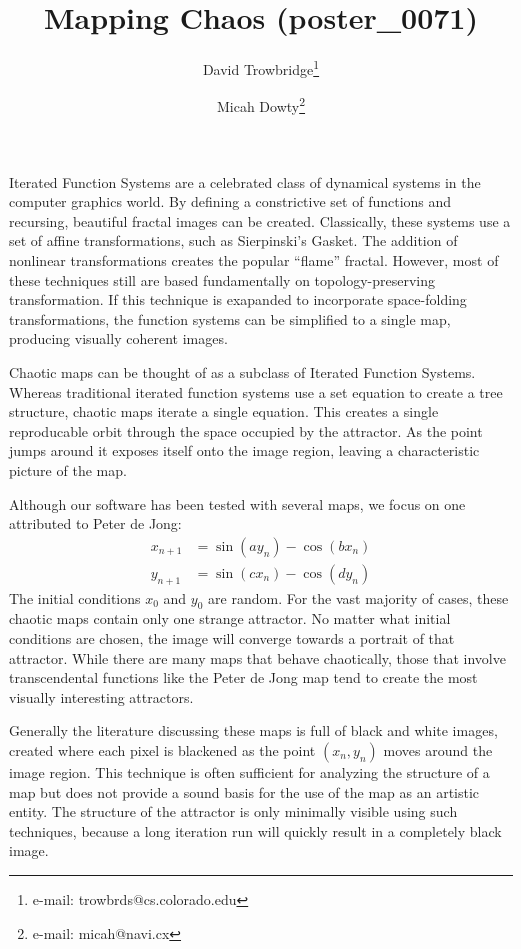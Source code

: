 \documentclass{acmsiggraph}
\title{Mapping Chaos (poster\_0071)}
\author{
  David Trowbridge\thanks{e-mail: trowbrds@cs.colorado.edu}
\and
  Micah Dowty\thanks{e-mail: micah@navi.cx}
}
\begin{document}
\maketitle

\copyrightspace

Iterated Function Systems are a celebrated class of dynamical systems in the
computer graphics world. By defining a constrictive set of functions and
recursing, beautiful fractal images can be created. Classically, these
systems use a set of affine transformations, such as Sierpinski's Gasket.
The addition of nonlinear transformations creates the popular ``flame''
fractal. However, most of these techniques still are based fundamentally
on topology-preserving transformation. If this technique is exapanded to
incorporate space-folding transformations, the function systems can be
simplified to a single map, producing visually coherent images.

Chaotic maps can be thought of as a subclass of Iterated Function Systems.
Whereas traditional iterated function systems use a set equation to create
a tree structure, chaotic maps iterate a single equation. This creates a
single reproducable orbit through the space occupied by the attractor. As
the point jumps around it exposes itself onto the image region, leaving
a characteristic picture of the map.

Although our software has been tested with several maps, we focus on one
attributed to Peter de Jong:
\begin{eqnarray*}
  x_{n+1} &= \sin (a y_n) - \cos (b x_n) \\
  y_{n+1} &= \sin (c x_n) - \cos (d y_n)
\end{eqnarray*}
The initial conditions $x_0$ and $y_0$ are random. For the vast majority
of cases, these chaotic maps contain only one strange attractor. No matter
what initial conditions are chosen, the image will converge towards a
portrait of that attractor. While there are many maps that behave
chaotically, those that involve transcendental functions like the Peter
de Jong map tend to create the most visually interesting attractors.

Generally the literature discussing these maps is full of black and white
images, created where each pixel is blackened as the point $(x_n, y_n)$
moves around the image region. This technique is often sufficient for
analyzing the structure of a map but does not provide a sound basis for
the use of the map as an artistic entity. The structure of the attractor
is only minimally visible using such techniques, because a long iteration
run will quickly result in a completely black image.
\end{document}
